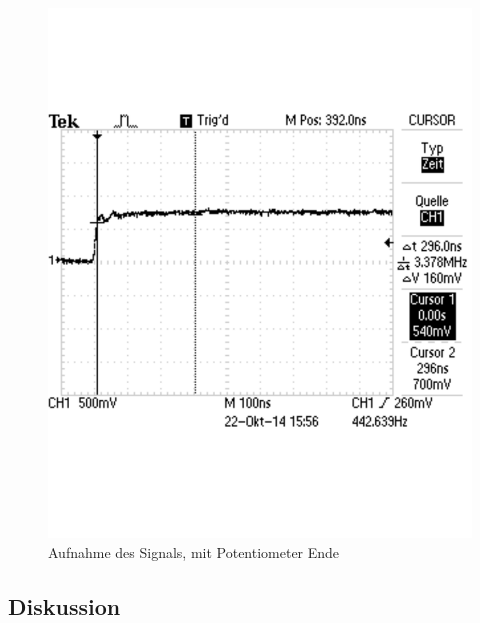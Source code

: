 \documentclass[12pt,a4paper]{article}
\begin{document}
\begin{figure}[H] 
  \centering
    \includegraphics[scale = 0.5]{4_a.pdf}
  	\caption[Aufnahme des Signals, mit offenem Ende]{Aufnahme des Signals, mit Potentiometer Ende}
  \label{fig:4_a}
\end{figure}

\subsection{Diskussion}
\end{document}
